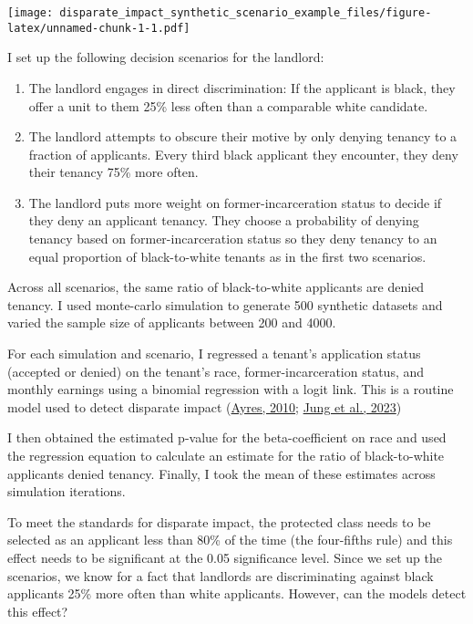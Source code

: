 \documentclass[
]{article}
\providecommand{\tightlist}{%
  \setlength{\itemsep}{0pt}\setlength{\parskip}{0pt}}
\begin{document}
\texttt{[image: disparate\_impact\_synthetic\_scenario\_example\_files/figure-latex/unnamed-chunk-1-1.pdf]}

I set up the following decision scenarios for the landlord:

\begin{enumerate}
\def\labelenumi{\arabic{enumi}.}
\tightlist
\item
  The landlord engages in direct discrimination: If the applicant is
  black, they offer a unit to them 25\% less often than a comparable
  white candidate.
\item
  The landlord attempts to obscure their motive by only denying tenancy
  to a fraction of applicants. Every third black applicant they
  encounter, they deny their tenancy 75\% more often.
\item
  The landlord puts more weight on former-incarceration status to decide
  if they deny an applicant tenancy. They choose a probability of
  denying tenancy based on former-incarceration status so they deny
  tenancy to an equal proportion of black-to-white tenants as in the
  first two scenarios.
\end{enumerate}

Across all scenarios, the same ratio of black-to-white applicants are
denied tenancy. I used monte-carlo simulation to generate 500 synthetic
datasets and varied the sample size of applicants between 200 and 4000.

For each simulation and scenario, I regressed a tenant's application
status (accepted or denied) on the tenant's race, former-incarceration
status, and monthly earnings using a binomial regression with a logit
link. This is a routine model used to detect disparate impact
(\href{https://www.law.upenn.edu/live/files/1138-ayresincludedvariablebiaspdf}{Ayres,
2010}; \href{https://5harad.com/papers/included-variable-bias.pdf}{Jung
et al., 2023})

I then obtained the estimated p-value for the beta-coefficient on race
and used the regression equation to calculate an estimate for the ratio
of black-to-white applicants denied tenancy. Finally, I took the mean of
these estimates across simulation iterations.

To meet the standards for disparate impact, the protected class needs to
be selected as an applicant less than 80\% of the time (the four-fifths
rule) and this effect needs to be significant at the 0.05 significance
level. Since we set up the scenarios, we know for a fact that landlords
are discriminating against black applicants 25\% more often than white
applicants. However, can the models detect this effect?
\end{document}
